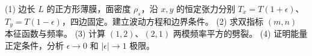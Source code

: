 (1) 边长 \(L\) 的正方形薄膜，面密度 \(\rho_s\)，沿 \(x,y\) 的恒定张力分别 \(T_x=T(1+\epsilon)\)、\(T_y=T(1-\epsilon)\)，四边固定。建立波动方程和边界条件。
(2) 求双指标 \((m,n)\) 本征函数与频率。
(3) 计算 \((1,2)\)、\((2,1)\) 两模频率平方的劈裂。
(4) 证明能量正定条件，分析 \(\epsilon\to0\) 和 \(|\epsilon|\to1\) 极限。
